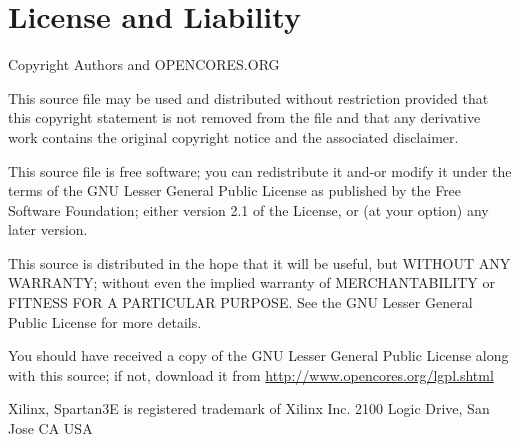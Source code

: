 \documentclass{gajewski}
\begin{document}
\newpage

\section{License and Liability}

Copyright  Authors and OPENCORES.ORG

This source file may be used and distributed without
restriction provided that this copyright statement is not
removed from the file and that any derivative work contains
the original copyright notice and the associated disclaimer.

This source file is free software; you can redistribute it
and-or modify it under the terms of the GNU Lesser General
Public License as published by the Free Software Foundation;
either version 2.1 of the License, or (at your option) any
later version.

This source is distributed in the hope that it will be
useful, but WITHOUT ANY WARRANTY; without even the implied
warranty of MERCHANTABILITY or FITNESS FOR A PARTICULAR
PURPOSE. See the GNU Lesser General Public License for more
details.

You should have received a copy of the GNU Lesser General
Public License along with this source; if not, download it
from \href{http://www.opencores.org/lgpl.shtml}{http://www.opencores.org/lgpl.shtml}

Xilinx, Spartan3E is registered trademark of Xilinx Inc. 2100 Logic Drive, San Jose CA USA

\newpage


\end{document}
